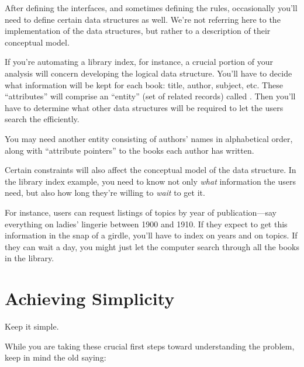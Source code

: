 After defining the interfaces, and sometimes defining the rules,
occasionally you'll need to define certain data structures as well.
We're not referring here to the implementation of the data structures,
but rather to a description of their conceptual model.

If you're automating a library index, for instance, a crucial portion
of your analysis will concern developing the logical data structure.
You'll have to decide what information will be kept for each book:
title, author, subject, etc. These ``attributes'' will comprise an
``entity'' (set of related records) called . Then you'll
have to determine what other data structures will be required to let
the users search the  efficiently.




You may need another entity consisting of authors' names in
alphabetical order, along with ``attribute pointers'' to the books
each author has written.

Certain constraints will also affect the conceptual model of the data
structure. In the library index example, you need to know not only
\emph{what} information the users need, but also how long they're
willing to \emph{wait} to get it.

For instance, users can request listings of topics by year of
publication---say everything on ladies' lingerie between 1900 and
1910.  If they expect to get this information in the snap of a girdle,
you'll have to index on years and on topics. If they can wait a day,
you might just let the computer search through all the books in the
library.

\section{Achieving Simplicity}

\begin{tip}
Keep it simple.
\end{tip}

\noindent While you are taking these crucial first steps toward
understanding the problem, keep in mind the old saying:

